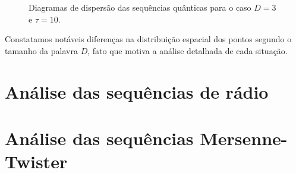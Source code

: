 \begin{figure}
\centering
{}
\caption{Diagramas de dispersão das sequências quânticas para o caso $D=3$ e $\tau=10$.}\label{Fig:QuantD3tau10}
\end{figure}


Constatamos notáveis diferenças na distribuição espacial dos pontos segundo o tamanho da palavra $D$, fato que motiva a análise detalhada de cada situação.

\section{Análise das sequências de rádio}

\section{Análise das sequências Mersenne-Twister}





